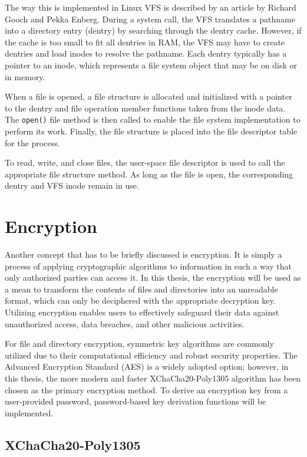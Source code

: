 The way this is implemented in Linux VFS is described by an article by Richard Gooch and Pekka Enberg\cite{vfs}.
During a system call, the VFS translates a pathname into a directory entry (dentry) by searching through the dentry cache.
However, if the cache is too small to fit all dentries in RAM, the VFS may have to create dentries and load inodes to resolve the pathname.
Each dentry typically has a pointer to an inode, which represents a file system object that may be on disk or in memory.

When a file is opened, a file structure is allocated and initialized with a pointer to the dentry and file operation member functions taken from the inode data.
The \texttt{open()} file method is then called to enable the file system implementation to perform its work.
Finally, the file structure is placed into the file descriptor table for the process.

To read, write, and close files, the user-space file descriptor is used to call the appropriate file structure method.
As long as the file is open, the corresponding dentry and VFS inode remain in use.


\section{Encryption}\label{sec:encryption-approaches}

Another concept that has to be briefly discussed is encryption.
It is simply a process of applying cryptographic algorithms to information in such a way that only authorized parties can access it.
In this thesis, the encryption will be used as a mean to transform the contents of files and directories into an unreadable format, which can only be deciphered with the appropriate decryption key.
Utilizing encryption enables users to effectively safeguard their data against unauthorized access, data breaches, and other malicious activities.

For file and directory encryption, symmetric key algorithms are commonly utilized due to their computational efficiency and robust security properties.
The Advanced Encryption Standard (AES) is a widely adopted option; however, in this thesis, the more modern and faster XChaCha20-Poly1305 algorithm has been chosen as the primary encryption method.
To derive an encryption key from a user-provided password, password-based key derivation functions will be implemented.

\subsection{XChaCha20-Poly1305}\label{subsec:xchacha20-poly1305}


